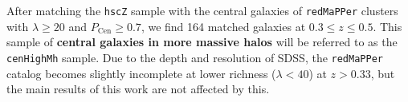 \documentclass[a4paper,fleqn,usenatbib]{mnras}
\def\arcsec{{\prime\prime}}
\def\redm{\texttt{redMaPPer}}
\def\rbcg{\texttt{cenHighMh}}
\def\mhalo{{$M_{\mathrm{halo}}$}}
\def\logms{{$\log (M_{\star}/M_{\odot})$}}
\def\logmh{{$\log (M_{\mathrm{halo}}/M_{\odot})$}}
\begin{document}
 

    
    

 
    After matching the \texttt{hscZ} sample with the central galaxies of \redm{} 
    clusters with $\lambda \geq 20$ and $P_{\mathrm{Cen}} \geq 0.7$, we find 164 
    matched galaxies at $0.3 \leq z \leq 0.5$.
    This sample of \textbf{central galaxies in more massive halos} will be referred to 
    as the \rbcg{} sample. 
    Due to the depth and resolution of SDSS, the \redm{} catalog becomes slightly 
    incomplete at lower richness ($\lambda < 40$) at $z > 0.33$, but the main results 
    of this work are not affected by this.
    
\end{document}

